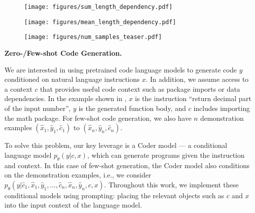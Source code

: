 \documentclass[nohyperref]{article}
\theoremstyle{plain}
\theoremstyle{definition}
\theoremstyle{remark}
\renewcommand{\paragraph}[1]{
     \textbf{#1} 
 }
\begin{document}
\begin{figure*}[t]
     \centering
     \begin{subfigure}[b]{0.32\textwidth}
         \centering
         \texttt{[image: figures/sum\_length\_dependency.pdf]}
         \caption{}
         \label{fig:sum_len}
     \end{subfigure}
     \hfill
     \begin{subfigure}[b]{0.32\textwidth}
         \centering
         \texttt{[image: figures/mean\_length\_dependency.pdf]}
         \caption{}
         \label{fig:mean_len}
     \end{subfigure}
     \hfill
     \begin{subfigure}[b]{0.32\textwidth}
         \centering
         \texttt{[image: figures/num\_samples\_teaser.pdf]}
         \caption{}
         \label{fig:num_samples_teaser}
     \end{subfigure}
     \vspace{-10pt}
     \caption{\ref{fig:sum_len} and \ref{fig:mean_len} show that the Coder model $p(y|x)$ has a strong dependence on the length of generated code and length normalization can introduce additional biases. \ref{fig:num_samples_teaser} shows that in practice, Coder-only reranking (Coder) and normalized Coder-only reranking (N. Coder) have worse performance when the number of samples becomes large, which can be caused by selecting degenerate solutions.}
     \vspace{-15pt}
\end{figure*}

\paragraph{Zero-/Few-shot Code Generation.}
We are interested in using pretrained code language models to generate code $y$ conditioned on natural language instructions $x$.
In addition, we assume access to a context $c$ that provides useful code context such as package imports or data dependencies.
In the example shown in , $x$ is the instruction ``return decimal part of the input number'', $y$ is the generated function body, and $c$ includes importing the math package.
For few-shot code generation, we also have $n$ demonstration examples $(\hat{x}_{1}, \hat{y}_{1}, \hat{c}_{1})$ to $(\hat{x}_{n}, \hat{y}_{n}, \hat{c}_{n})$.

To solve this problem, our key leverage is a Coder model --- a conditional language model $p_{\theta}(y|c,x)$, which can generate programs given the instruction and context.
In this case of few-shot generation, the Coder model also conditions on the demonstration examples, i.e., we consider $p_{\theta}(y | \hat{c}_{1}, \hat{x}_{1}, \hat{y}_{1}, \ldots, \hat{c}_{n}, \hat{x}_{n}, \hat{y}_{n}, c, x )$.
Throughout this work, we implement these conditional models using prompting: placing the relevant objects such as $c$ and $x$ into the input context of the language model.
\end{document}
